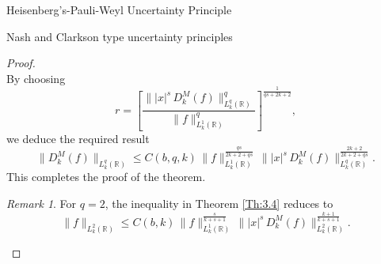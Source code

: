 \documentclass[12pt,a4paper,reqno]{amsproc}
\theoremstyle{definition}
\theoremstyle{remark}
\newtheorem{remark}[theorem]{Remark}
\numberwithin{equation}{section}
\begin{document}
\begin{subsection}{Heisenberg's-Pauli-Weyl Uncertainty Principle}
\begin{subsection}{Nash and Clarkson type uncertainty principles}
\begin{proof}
\begin{equation*}
\end{equation*}
By choosing $$r= \left[\frac{\||x|^s\, D_k^M(f)\|^{q}_{L_k^{q}(\mathbb{R})} }{\|f\|^{q}_{L_k^1(\mathbb{R})}}\right]^{\frac{1}{qs+2k+2}},$$ we deduce the required result
\begin{equation*}
    \|D_k^M(f)\|_{L_k^{q}(\mathbb{R})}\le C(b,q,k)\, \|f\|_{L_k^1(\mathbb{R})}^{\frac{qs}{2k+2+qs}}\, \||x|^s\, D_k^M(f)\|_{L_k^{q}(\mathbb{R})}^{\frac{2k+2}{2k+2+qs}}.
\end{equation*}
This completes the proof of the theorem.
\begin{remark}
    For $q=2$, the inequality in Theorem \ref{Th:3.4} reduces to \begin{equation*}
    \|f\|_{L_k^{2}(\mathbb{R})}\le C(b,k)\, \|f\|_{L_k^1(\mathbb{R})}^{\frac{s}{k+s+1}}\, \||x|^s\, D_k^M(f)\|_{L_k^{2}(\mathbb{R})}^{\frac{k+1}{k+s+1}}.
\end{equation*} 
\end{remark}



\end{proof}


\end{subsection}
\end{subsection}
\end{document}
